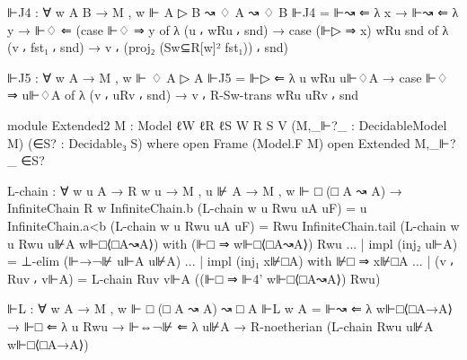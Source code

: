\begin{spverbatim}
  ⊩J4 : ∀ {w A B} → M , w ⊩ A ▷ B ↝ ♢ A ↝ ♢ B
  ⊩J4 = ⊩↝ ⇐ λ x → ⊩↝ ⇐ λ y → ⊩♢ ⇐ (case ⊩♢ ⇒ y of λ { (u ⸴ wRu ⸴ snd)
    → case (⊩▷ ⇒ x) wRu snd of λ { (v ⸴ fst₁ ⸴ snd)
    → v ⸴ (proj₂ (Sw⊆R[w]² fst₁)) ⸴ snd}})

  ⊩J5 : ∀ {w A} → M , w ⊩ ♢ A ▷ A
  ⊩J5 = ⊩▷ ⇐ λ {u} wRu u⊩♢A → case ⊩♢ ⇒ u⊩♢A of λ { (v ⸴ uRv ⸴ snd) →
    v ⸴ R-Sw-trans wRu uRv ⸴ snd}


module Extended2
  {M : Model {ℓW} {ℓR} {ℓS} W R S V}
  (M,_⊩?_ : DecidableModel M)
  (∈S? : Decidable₃ S)
  where
  open Frame (Model.F M)
  open Extended M,_⊩?_ ∈S?

  L-chain : ∀ {w u A} → R w u → M , u ⊮ A → M , w ⊩ □ (□ A ↝ A) → InfiniteChain R w
  InfiniteChain.b (L-chain {w} {u} Rwu uA uF) = u
  InfiniteChain.a<b (L-chain {w} {u} Rwu uA uF) = Rwu
  InfiniteChain.tail (L-chain {w} {u} Rwu u⊮A w⊩□⟨□A↝A⟩)
     with (⊩□ ⇒ w⊩□⟨□A↝A⟩) Rwu
  ... | impl (inj₂ u⊩A) = ⊥-elim (⊩→¬⊮ u⊩A u⊮A)
  ... | impl (inj₁ x⊮□A) with ⊮□ ⇒ x⊮□A
  ... | (v ⸴ Ruv ⸴ v⊩A) = L-chain Ruv v⊩A ((⊩□ ⇒ ⊩4' w⊩□⟨□A↝A⟩) Rwu)

  ⊩L : ∀ {w A} → M , w ⊩ □ (□ A ↝ A) ↝ □ A
  ⊩L {w} {A} = ⊩↝ ⇐ λ w⊩□⟨□A→A⟩ → ⊩□ ⇐ λ {u} Rwu → ⊩⇔¬⊮ ⇐
    λ {u⊮A → R-noetherian (L-chain Rwu u⊮A w⊩□⟨□A→A⟩)}
\end{spverbatim}

